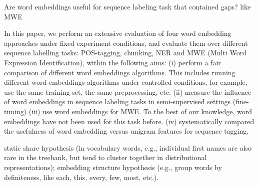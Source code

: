 \documentclass[11pt]{article}
\begin{document}
Are word embeddings useful for sequence labeling task 
that contained gaps? like MWE




In this paper, we perform an extensive evaluation of four word embedding approaches under fixed experiment conditions, and evaluate them over different sequence labelling tasks: POS-tagging, chunking, 
NER and MWE (Multi Word Expression Identification), 
within the following aims:
(i) perform a fair comparison of different word embeddings
algorithms. This includes running different word embeddings algorithms under controlled conditions, for example, use the same training set, the same preprocessing, etc.
(ii) measure the influence of word embeddings in sequence labeling tasks in semi-supervised settings (fine-tuning)
(iii) use word embeddings for MWE. To the best of our knowledge, 
word embeddings have not been used for this task before.
(iv) systematically compared the usefulness of word embedding versus
unigram features for sequence tagging.


static share hypothesis (in vocabulary words, e.g., individual first names are also rare in the treebank, but tend to cluster together in distributional representations);
embedding structure hypothesis (e.g., group words by definiteness, like each, this, every, few, most, etc.).
\end{document}
